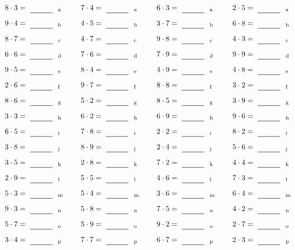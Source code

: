 \documentclass
[
  draft    = true,
  fontsize = 11pt,
  parskip  = half-
]
{scrartcl}
\begin{document}
\par\vfill\par
\begin{align*}
    \pline{8\cdot3}&=\rline{a}
  & \pline{7\cdot4}&=\rline{a}
  & \pline{6\cdot3}&=\rline{a}
  & \pline{2\cdot5}&=\rline{a} \\[1ex]
    \pline{9\cdot4}&=\rline{b}
  & \pline{4\cdot5}&=\rline{b}
  & \pline{3\cdot7}&=\rline{b}
  & \pline{6\cdot8}&=\rline{b} \\[1ex]
    \pline{8\cdot7}&=\rline{c}
  & \pline{4\cdot7}&=\rline{c}
  & \pline{9\cdot8}&=\rline{c}
  & \pline{4\cdot3}&=\rline{c} \\[1ex]
    \pline{6\cdot6}&=\rline{d}
  & \pline{7\cdot6}&=\rline{d}
  & \pline{7\cdot9}&=\rline{d}
  & \pline{9\cdot9}&=\rline{d} \\[1ex]
    \pline{9\cdot5}&=\rline{e}
  & \pline{8\cdot4}&=\rline{e}
  & \pline{4\cdot9}&=\rline{e}
  & \pline{4\cdot8}&=\rline{e} \\[1ex]
    \pline{2\cdot6}&=\rline{f}
  & \pline{9\cdot7}&=\rline{f}
  & \pline{8\cdot8}&=\rline{f}
  & \pline{3\cdot2}&=\rline{f} \\[1ex]
    \pline{8\cdot6}&=\rline{g}
  & \pline{5\cdot2}&=\rline{g}
  & \pline{8\cdot5}&=\rline{g}
  & \pline{3\cdot9}&=\rline{g} \\[1ex]
    \pline{3\cdot3}&=\rline{h}
  & \pline{6\cdot2}&=\rline{h}
  & \pline{6\cdot9}&=\rline{h}
  & \pline{9\cdot6}&=\rline{h} \\[1ex]
    \pline{6\cdot5}&=\rline{i}
  & \pline{7\cdot8}&=\rline{i}
  & \pline{2\cdot2}&=\rline{i}
  & \pline{8\cdot2}&=\rline{i} \\[1ex]
    \pline{3\cdot8}&=\rline{j}
  & \pline{8\cdot9}&=\rline{j}
  & \pline{2\cdot4}&=\rline{j}
  & \pline{5\cdot6}&=\rline{j} \\[1ex]
    \pline{3\cdot5}&=\rline{k}
  & \pline{2\cdot8}&=\rline{k}
  & \pline{7\cdot2}&=\rline{k}
  & \pline{4\cdot4}&=\rline{k} \\[1ex]
    \pline{2\cdot9}&=\rline{l}
  & \pline{5\cdot5}&=\rline{l}
  & \pline{4\cdot6}&=\rline{l}
  & \pline{7\cdot3}&=\rline{l} \\[1ex]
    \pline{5\cdot3}&=\rline{m}
  & \pline{5\cdot4}&=\rline{m}
  & \pline{3\cdot6}&=\rline{m}
  & \pline{6\cdot4}&=\rline{m} \\[1ex]
    \pline{9\cdot3}&=\rline{n}
  & \pline{5\cdot8}&=\rline{n}
  & \pline{7\cdot5}&=\rline{n}
  & \pline{4\cdot2}&=\rline{n} \\[1ex]
    \pline{5\cdot7}&=\rline{o}
  & \pline{5\cdot9}&=\rline{o}
  & \pline{9\cdot2}&=\rline{o}
  & \pline{2\cdot7}&=\rline{o} \\[1ex]
    \pline{3\cdot4}&=\rline{p}
  & \pline{7\cdot7}&=\rline{p}
  & \pline{6\cdot7}&=\rline{p}
  & \pline{2\cdot3}&=\rline{p}
\end{align*}
\end{document}
